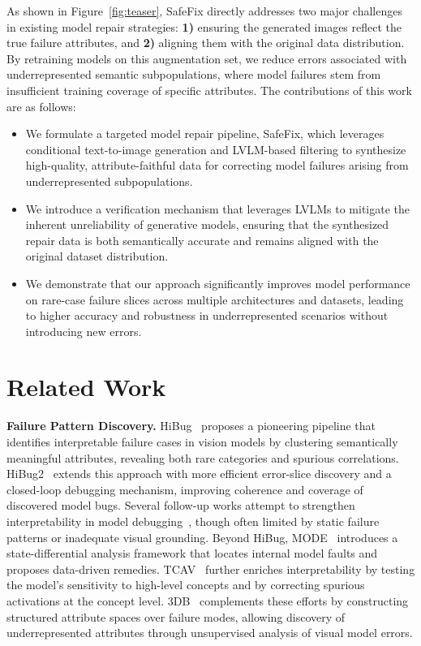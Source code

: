 \documentclass[10pt]{article} %
\newcommand{\model}{SafeFix\xspace}
\newcommand{\hibug}{HiBug\xspace}
\begin{document}
As shown in Figure~\ref{fig:teaser}, \model directly addresses two major challenges in existing model repair strategies: {\bf 1)} ensuring the generated images reflect the true failure attributes, and {\bf 2)} aligning them with the original data distribution. By retraining models on this augmentation set, we reduce errors associated with underrepresented semantic subpopulations, where model failures stem from insufficient training coverage of specific attributes. The contributions of this work are as follows:
\begin{itemize}
\item We formulate a targeted model repair pipeline, \model, which leverages conditional text-to-image generation and LVLM-based filtering to synthesize high-quality, attribute-faithful data for correcting model failures arising from underrepresented subpopulations.

\item We introduce a  verification mechanism that leverages LVLMs to mitigate the inherent unreliability of generative models, ensuring that the synthesized repair data is both semantically accurate and remains aligned with the original dataset distribution.

\item We demonstrate that our approach significantly improves model performance on rare-case failure slices across multiple architectures and datasets, leading to higher accuracy and robustness in underrepresented scenarios without introducing new errors.
\end{itemize}

\section{Related Work}
\textbf{Failure Pattern Discovery.} \hibug~\citep{chen2023hibug} proposes a pioneering pipeline that identifies interpretable failure cases in vision models by clustering semantically meaningful attributes, revealing both rare categories and spurious correlations.
HiBug2~\citep{chen2025hibug2} extends this approach with more efficient error-slice discovery and a closed-loop debugging mechanism, improving coherence and coverage of discovered model bugs.
Several follow-up works attempt to strengthen interpretability in model debugging~\citep{adebayo2020debugging, adebayo2022posthoc}, though often limited by static failure patterns or inadequate visual grounding.
Beyond \hibug, MODE~\citep{vendrow2023dataset} introduces a state-differential analysis framework that locates internal model faults and proposes data-driven remedies.
TCAV~\citep{kim2018tcav} further enriches interpretability by testing the model’s sensitivity to high-level concepts and by correcting spurious activations at the concept level. 3DB~\citep{leclerc20223db} complements these efforts by constructing structured attribute spaces over failure modes, allowing discovery of underrepresented attributes through unsupervised analysis of visual model errors.
\end{document}

